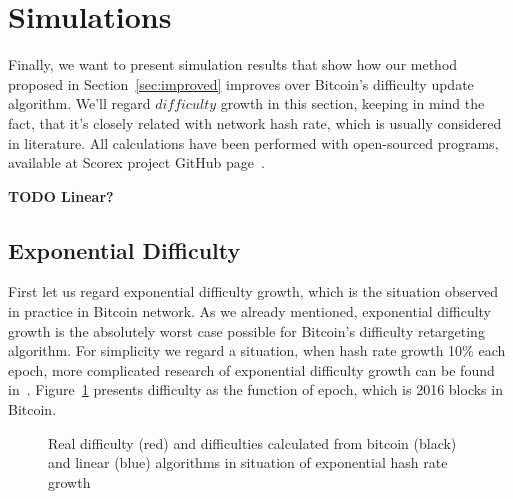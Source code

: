 \documentclass[number,preprint,review]{elsarticle}
\begin{document}
\section{Simulations}
\label{sec:sim}

Finally, we want to present simulation results that show how our method proposed in Section~\ref{sec:improved} improves over Bitcoin’s difficulty update algorithm.
We'll regard \(difficulty\) growth in this section, keeping in mind the fact, that it's closely related with network hash rate, which is usually considered in literature.
All calculations have been performed with open-sourced programs, available at Scorex project GitHub page~\cite{scorex}.

\textbf{TODO Linear?}

\subsection{Exponential Difficulty}

First let us regard exponential difficulty growth, which is the situation observed in practice in Bitcoin network.
As we already mentioned, exponential difficulty growth is the absolutely worst case possible for Bitcoin’s difficulty retargeting algorithm.
For simplicity we regard a situation, when hash rate growth 10\% each epoch, more complicated research of exponential difficulty growth can be found in~\cite{kraft2015difficulty}.
Figure~\ref{fig:exp} presents difficulty as the function of epoch, which is 2016 blocks in Bitcoin.

\begin{figure}[h]
\caption{Real difficulty (red) and difficulties calculated from bitcoin (black) and linear (blue) algorithms in situation of exponential hash rate growth}
\label{fig:exp}
\end{figure}
\end{document}
